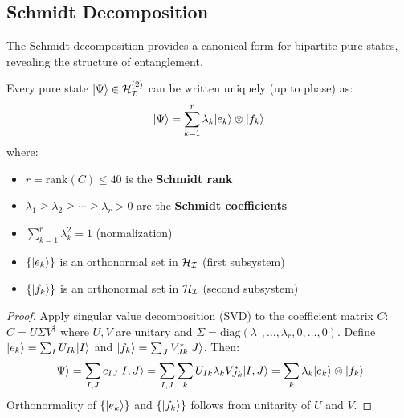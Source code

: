 \subsection{Schmidt Decomposition}

The Schmidt decomposition provides a canonical form for bipartite pure states, revealing the structure of entanglement.

\begin{theorem}
\label{thm:schmidt}
Every pure state $|\Psi\rangle \in \mathcal{H}_{\mathcal{I}}^{(2)}$ can be written uniquely (up to phase) as:
\[
|\Psi\rangle = \sum_{k=1}^{r} \lambda_k |e_k\rangle \otimes |f_k\rangle
\]
where:
\begin{itemize}
  \item $r = \mathrm{rank}(C) \leq 40$ is the \textbf{Schmidt rank}
  \item $\lambda_1 \geq \lambda_2 \geq \cdots \geq \lambda_r > 0$ are the \textbf{Schmidt coefficients}
  \item $\sum_{k=1}^{r} \lambda_k^2 = 1$ (normalization)
  \item $\{|e_k\rangle\}$ is an orthonormal set in $\mathcal{H}_{\mathcal{I}}$ (first subsystem)
  \item $\{|f_k\rangle\}$ is an orthonormal set in $\mathcal{H}_{\mathcal{I}}$ (second subsystem)
\end{itemize}
\end{theorem}

\begin{proof}
Apply singular value decomposition (SVD) to the coefficient matrix $C$: $C = U \Sigma V^\dagger$ where $U, V$ are unitary and $\Sigma = \mathrm{diag}(\lambda_1, \ldots, \lambda_r, 0, \ldots, 0)$. Define $|e_k\rangle = \sum_I U_{Ik} |I\rangle$ and $|f_k\rangle = \sum_J V_{Jk}^* |J\rangle$. Then:
\[
|\Psi\rangle = \sum_{I,J} c_{IJ} |I,J\rangle = \sum_{I,J} \sum_k U_{Ik} \lambda_k V_{Jk}^* |I,J\rangle = \sum_k \lambda_k |e_k\rangle \otimes |f_k\rangle
\]
Orthonormality of $\{|e_k\rangle\}$ and $\{|f_k\rangle\}$ follows from unitarity of $U$ and $V$.
\end{proof}

